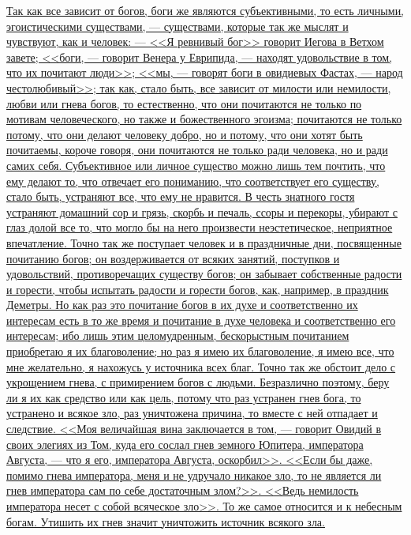 \documentclass[12pt]{article}
\begin{document}
\hyperlink{b2}{Так как все зависит от богов, боги же являются субъективными, то есть личными, эгоистическими существами, --- существами, которые так же мыслят и чувствуют, как и человек: --- <<Я ревнивый бог>>  говорит Иегова в Ветхом завете; <<боги, --- говорит Венера у Еврипида, --- находят удовольствие в том, что их почитают люди>>; <<мы, --- говорят боги в овидиевых Фастах, --- народ честолюбивый>>; так как, стало быть, все зависит от милости или немилости, любви или гнева богов, то естественно, что они почитаются не только по мотивам человеческого, но также и божественного эгоизма; почитаются не только потому, что они делают человеку добро, но и потому, что они хотят быть почитаемы, короче говоря, они почитаются не только ради человека, но и ради самих себя. Субъективное или личное существо можно лишь тем почтить, что ему делают то, что отвечает его пониманию, что соответствует его существу, стало быть, устраняют все, что ему не нравится. В честь знатного гостя устраняют домашний сор и грязь, скорбь и печаль, ссоры и перекоры, убирают с глаз долой все то, что могло бы на него произвести неэстетическое, неприятное впечатление. Точно так же поступает человек и в праздничные дни, посвященные почитанию богов; он воздерживается от всяких занятий, поступков и удовольствий, противоречащих существу богов; он забывает собственные радости и горести, чтобы испытать радости и горести богов, как, например, в праздник Деметры. Но как раз это почитание богов в их духе и соответственно их интересам есть в то же время и почитание в духе человека и соответственно его интересам; ибо лишь этим целомудренным, бескорыстным почитанием приобретаю я их благоволение; но раз я имею их благоволение, я имею все, что мне желательно, я нахожусь у источника всех благ. Точно так же обстоит дело с укрощением гнева, с примирением богов с людьми. Безразлично поэтому, беру ли я их как средство или как цель, потому что раз устранен гнев бога, то устранено и всякое зло, раз уничтожена причина, то вместе с ней отпадает и следствие. <<Моя величайшая вина заключается в том, --- говорит Овидий в своих элегиях из Том, куда его сослал гнев земного Юпитера, императора Августа, --- что я его, императора Августа, оскорбил>>. <<Если бы даже, помимо гнева императора, меня и не удручало никакое зло, то не является ли гнев императора сам по себе достаточным злом?>>. <<Ведь немилость императора несет с собой всяческое зло>>. То же самое относится и к небесным богам. Утишить их гнев значит уничтожить источник всякого зла.} 
\end{document}
